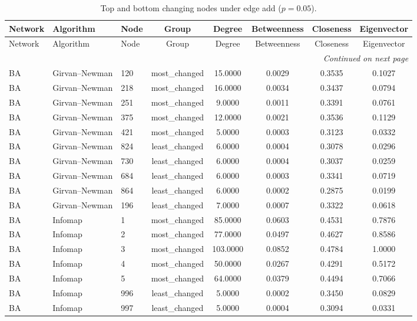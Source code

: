 \begin{longtable}{lllccccc}
\caption{Top and bottom changing nodes under edge add ($p=0.05$).}\label{tab:node_add_p005}\\
\toprule
Network & Algorithm & Node & Group & Degree & Betweenness & Closeness & Eigenvector \\
\midrule
\endfirsthead
\toprule
Network & Algorithm & Node & Group & Degree & Betweenness & Closeness & Eigenvector \\
\midrule
\endhead
\midrule
\multicolumn{8}{r}{\emph{Continued on next page}} \\
\endfoot
\bottomrule
\endlastfoot
BA & Girvan--Newman & 120 & most\_changed & 15.0000 & 0.0029 & 0.3535 & 0.1027 \\
BA & Girvan--Newman & 218 & most\_changed & 16.0000 & 0.0034 & 0.3437 & 0.0794 \\
BA & Girvan--Newman & 251 & most\_changed & 9.0000 & 0.0011 & 0.3391 & 0.0761 \\
BA & Girvan--Newman & 375 & most\_changed & 12.0000 & 0.0021 & 0.3536 & 0.1129 \\
BA & Girvan--Newman & 421 & most\_changed & 5.0000 & 0.0003 & 0.3123 & 0.0332 \\
BA & Girvan--Newman & 824 & least\_changed & 6.0000 & 0.0004 & 0.3078 & 0.0296 \\
BA & Girvan--Newman & 730 & least\_changed & 6.0000 & 0.0004 & 0.3037 & 0.0259 \\
BA & Girvan--Newman & 684 & least\_changed & 6.0000 & 0.0003 & 0.3341 & 0.0719 \\
BA & Girvan--Newman & 864 & least\_changed & 6.0000 & 0.0002 & 0.2875 & 0.0199 \\
BA & Girvan--Newman & 196 & least\_changed & 7.0000 & 0.0007 & 0.3322 & 0.0618 \\
BA & Infomap & 1 & most\_changed & 85.0000 & 0.0603 & 0.4531 & 0.7876 \\
BA & Infomap & 2 & most\_changed & 77.0000 & 0.0497 & 0.4627 & 0.8586 \\
BA & Infomap & 3 & most\_changed & 103.0000 & 0.0852 & 0.4784 & 1.0000 \\
BA & Infomap & 4 & most\_changed & 50.0000 & 0.0267 & 0.4291 & 0.5172 \\
BA & Infomap & 5 & most\_changed & 64.0000 & 0.0379 & 0.4494 & 0.7066 \\
BA & Infomap & 996 & least\_changed & 5.0000 & 0.0002 & 0.3450 & 0.0829 \\
BA & Infomap & 997 & least\_changed & 5.0000 & 0.0004 & 0.3094 & 0.0331 \\

\end{longtable}
